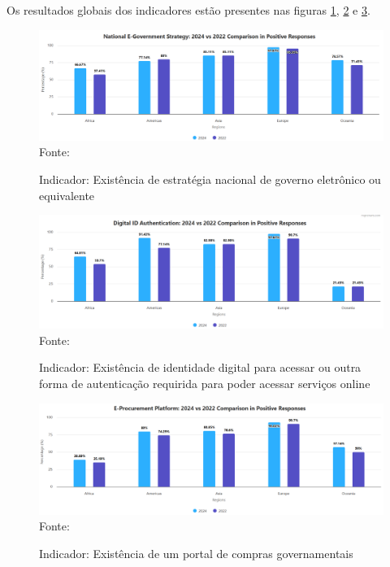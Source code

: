 Os resultados globais dos indicadores estão presentes nas figuras \ref{fig:national_government_strategy}, \ref{fig:national_identity} e \ref{fig:procurement_portal}.

\begin{figure}[H]
	\centering
	\caption{Indicador: Existência de estratégia nacional de governo eletrônico ou equivalente}
	\includegraphics[width=1\linewidth]{figuras/ict_in_government/national_government_strategy}
	\label{fig:national_government_strategy}
	\footnotesize{Fonte: \cite{ONU_ICT_in_government_indicators}}
\end{figure}

\begin{figure}[H]
	\centering
	\caption{Indicador: Existência de identidade digital para acessar ou outra forma de autenticação requirida para poder acessar serviços online}
	\includegraphics[width=1\linewidth]{figuras/ict_in_government/digital_identity}
	\label{fig:national_identity}
	\footnotesize{Fonte: \cite{ONU_ICT_in_government_indicators}}
\end{figure}

\begin{figure}[H]
	\centering
	\caption{Indicador: Existência de um portal de compras governamentais}
	\includegraphics[width=1\linewidth]{figuras/ict_in_government/procurement_portal}
	\label{fig:procurement_portal}
	\footnotesize{Fonte: \cite{ONU_ICT_in_government_indicators}}
\end{figure}

